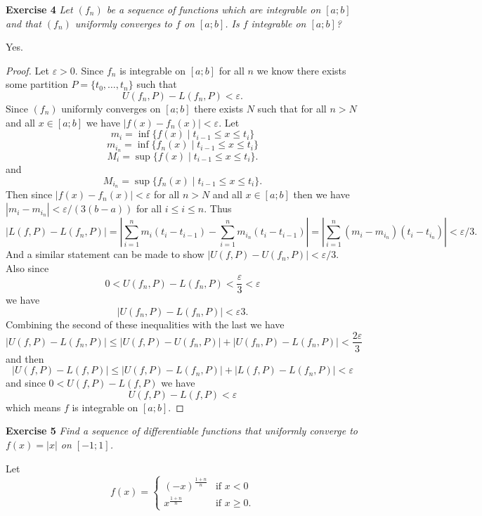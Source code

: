 \documentclass{article}
\begin{document}
\begin{flushleft}
\textbf{Exercise 4}
\textsl{Let $(f_n)$ be a sequence of functions which are integrable on $[a;b]$ and that $(f_n)$ uniformly converges to $f$ on $[a;b]$. Is $f$ integrable on $[a;b]$?}\newline

Yes.
\begin{proof}
Let $\varepsilon > 0$. Since $f_n$ is integrable on $[a;b]$ for all $n$ we know there exists some partition $P = \{t_0, \dots , t_n\}$ such that
\[
U(f_n,P) - L(f_n,P) < \varepsilon.
\]
Since $(f_n)$ uniformly converges on $[a;b]$ there exists $N$ such that for all $n>N$ and all $x \in [a;b]$ we have $|f(x) - f_n(x)| < \varepsilon$. Let
\[
m_i = \inf \{f(x) \mid t_{i-1} \leq x \leq t_i\}
\]
\[
m_{i_n} = \inf \{f_n(x) \mid t_{i-1} \leq x \leq t_i\}
\]
\[
M_i = \sup \{f(x) \mid t_{i-1} \leq x \leq t_i\}.
\]
and
\[
M_{i_n} = \sup \{f_n(x) \mid t_{i-1} \leq x \leq t_i\}.
\]
Then since $|f(x) - f_n(x)| < \varepsilon$ for all $n>N$ and all $x \in [a;b]$ then we have $|m_i - m_{i_n}| < \varepsilon/(3(b-a))$ for all $i \leq i \leq n$. Thus
\[
|L(f,P) - L(f_n,P)| = \left | \sum_{i=1}^n m_i (t_i - t_{i-1}) - \sum_{i=1}^n m_{i_n} (t_i - t_{i-1}) \right | = \left | \sum_{i=1}^n (m_i - m_{i_n}) (t_i - t_{i_n}) \right | < \varepsilon/3.
\]
And a similar statement can be made to show $|U(f,P) - U(f_n,P)| < \varepsilon/3$. Also since
\[
0 < U(f_n,P) - L(f_n,P) < \frac{\varepsilon}{3} < \varepsilon
\]
we have
\[
|U(f_n,P) - L(f_n,P)| < {\varepsilon}{3}.
\]
Combining the second of these inequalities with the last we have
\[
|U(f,P) - L(f_n,P)| \leq |U(f,P) - U(f_n,P)| + |U(f_n,P) - L(f_n,P)| < \frac{2 \varepsilon}{3}
\]
and then
\[
|U(f,P) - L(f,P)| \leq |U(f,P) - L(f_n,P)| + |L(f,P) - L(f_n,P)| < \varepsilon
\]
and since $0 < U(f,P) - L(f,P)$ we have
\[
U(f,P) - L(f,P) < \varepsilon
\]
which means $f$ is integrable on $[a;b]$.
\end{proof}

\textbf{Exercise 5}
\textsl{Find a sequence of differentiable functions that uniformly converge to $f(x) = |x|$ on $[-1;1]$.}\newline

Let
\[
f(x) =
\begin{cases}
(-x)^{\frac{1+n}{n}} & \text{if $x < 0$}\\
x^{\frac{1+n}{n}} & \text{if $x \geq 0$}.
\end{cases}
\]


\end{flushleft}
\end{document}
